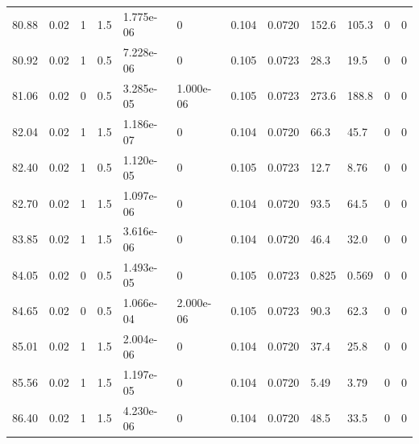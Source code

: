 \documentclass[preview]{standalone}
\begin{document}
{{{{\begin{tabular}{L{1.2cm}C{1.2cm} C{0.3cm}C{0.5cm} C{1.4cm}C{1.4cm} C{1.4cm}C{1.4cm} C{1.6cm}C{1.6cm} C{1.6cm}C{1.6cm}}
  80.88  &  0.02  & 1     & 1.5 &  1.775e-06  & 0  &  0.104&   0.0720& 152.6 & 105.3   &  0 & 0  \\ 
  80.92  &  0.02  & 1     & 0.5 &  7.228e-06  & 0  &  0.105&   0.0723& 28.3 & 19.5   &  0 & 0  \\ 
  81.06  &  0.02  & 0     & 0.5 &  3.285e-05  & 1.000e-06  &  0.105&   0.0723& 273.6 & 188.8   &  0 & 0  \\ 
  82.04  &  0.02  & 1     & 1.5 &  1.186e-07  & 0  &  0.104&   0.0720& 66.3 & 45.7   &  0 & 0  \\ 
  82.40  &  0.02  & 1     & 0.5 &  1.120e-05  & 0  &  0.105&   0.0723& 12.7 & 8.76   &  0 & 0  \\ 
  82.70  &  0.02  & 1     & 1.5 &  1.097e-06  & 0  &  0.104&   0.0720& 93.5 & 64.5   &  0 & 0  \\ 
  83.85  &  0.02  & 1     & 1.5 &  3.616e-06  & 0  &  0.104&   0.0720& 46.4 & 32.0   &  0 & 0  \\ 
  84.05  &  0.02  & 0     & 0.5 &  1.493e-05  & 0  &  0.105&   0.0723& 0.825 & 0.569   &  0 & 0  \\ 
  84.65  &  0.02  & 0     & 0.5 &  1.066e-04  & 2.000e-06  &  0.105&   0.0723& 90.3 & 62.3   &  0 & 0  \\ 
  85.01  &  0.02  & 1     & 1.5 &  2.004e-06  & 0  &  0.104&   0.0720& 37.4 & 25.8   &  0 & 0  \\ 
  85.56  &  0.02  & 1     & 1.5 &  1.197e-05  & 0  &  0.104&   0.0720& 5.49 & 3.79   &  0 & 0  \\ 
  86.40  &  0.02  & 1     & 1.5 &  4.230e-06  & 0  &  0.104&   0.0720& 48.5 & 33.5   &  0 & 0  \\ 
\hline 
\end{tabular} 

}}}}
\end{document}
